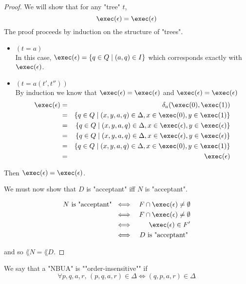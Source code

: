 \documentclass{article}
\begin{document}
\begin{proof}
	We will show that for any "tree" $t$,
	\[ \exec (\epsilon)  = \exec (\epsilon) \]
	The proof proceeds by induction on the structure of "trees".
	\begin{itemize}
		\item $(t = a)$\\
		      In this case, $\exec (\epsilon) = \setdef {q \in Q} {(a,q) \in I}$ which corresponds
		      exactly with $\exec (\epsilon)$.

		\item $(t = a(t',t''))$\\
		      By induction we know that
		      $\exec (\epsilon) = \exec (\epsilon)$
		      and
		      $\exec (\epsilon) =  \exec (\epsilon)$
		      \begin{eqnarray*}
			      \exec (\epsilon) &=& \delta_a(\exec (0), \exec (1)) \\
			      &=& \setdef {q \in  Q} {(x,y,a,q) \in \Delta, x \in \exec (0), y \in \exec (1)}\\
			      &=& \setdef {q \in  Q} {(x,y,a,q) \in \Delta, x \in \exec (\epsilon), y \in \exec (\epsilon)}\\
			      &=& \setdef {q \in  Q} {(x,y,a,q) \in \Delta, x \in \exec (\epsilon), y \in \exec (\epsilon)}\\
			      &=& \setdef {q \in  Q} {(x,y,a,q) \in \Delta, x \in \exec (0), y \in \exec (1)}\\
			      &=& \exec (\epsilon)
		      \end{eqnarray*}
	\end{itemize}
	Then $ \exec (\epsilon) = \exec (\epsilon)$.

	We must now show that $D$ is "acceptant" iff $N$ is "acceptant".

	\begin{eqnarray*}
		N \text{ is "acceptant" } &\iff& F \cap \exec (\epsilon) \neq \emptyset \\
		&\iff& F \cap \exec (\epsilon) \neq \emptyset \\
		&\iff& \exec (\epsilon) \in F' \\
		&\iff& D \text{ is "acceptant" }
	\end{eqnarray*}

	and so $\lang N = \lang D$.

\end{proof}


\begin{definition}
	We say that a "NBUA" is ""order-insensitive"" if
	\[ \forall p,q,a,r,\, (p,q,a,r) \in \Delta \iff  (q,p,a,r) \in \Delta \]
\end{definition}
\end{document}
